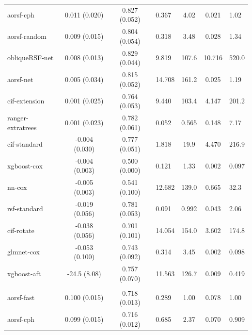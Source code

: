 \documentclass[twoside,11pt]{article}\usepackage[]{graphicx}\usepackage[]{xcolor}
\newenvironment{knitrout}{}{} %
\begin{document}
\begin{knitrout}
\begin{longtable}{lcclccl}
\hspace{1em}aorsf-cph & 0.011 (0.020) & 0.827 (0.052) & 0.367 & 4.02 & 0.021 & 1.02\\
\hspace{1em}aorsf-random & 0.009 (0.015) & 0.804 (0.054) & 0.318 & 3.48 & 0.028 & 1.34\\
\hspace{1em}obliqueRSF-net & 0.008 (0.013) & 0.829 (0.044) & 9.819 & 107.6 & 10.716 & 520.0\\
\hspace{1em}aorsf-net & 0.005 (0.034) & 0.815 (0.052) & 14.708 & 161.2 & 0.025 & 1.19\\
\hspace{1em}cif-extension & 0.001 (0.025) & 0.764 (0.053) & 9.440 & 103.4 & 4.147 & 201.2\\
\hspace{1em}ranger-extratrees & 0.001 (0.023) & 0.782 (0.061) & 0.052 & 0.565 & 0.148 & 7.17\\
\hspace{1em}cif-standard & -0.004 (0.030) & 0.777 (0.051) & 1.818 & 19.9 & 4.470 & 216.9\\
\hspace{1em}xgboost-cox & -0.004 (0.003) & 0.500 (0.000) & 0.121 & 1.33 & 0.002 & 0.097\\
\hspace{1em}nn-cox & -0.005 (0.003) & 0.541 (0.100) & 12.682 & 139.0 & 0.665 & 32.3\\
\hspace{1em}rsf-standard & -0.019 (0.056) & 0.781 (0.053) & 0.091 & 0.992 & 0.043 & 2.06\\
\hspace{1em}cif-rotate & -0.038 (0.056) & 0.701 (0.101) & 14.054 & 154.0 & 3.602 & 174.8\\
\hspace{1em}glmnet-cox & -0.053 (0.100) & 0.743 (0.092) & 0.314 & 3.45 & 0.002 & 0.098\\
\hspace{1em}xgboost-aft & -24.5 (8.08) & 0.757 (0.070) & 11.563 & 126.7 & 0.009 & 0.419\\
\addlinespace[0.3em]
\hline
\multicolumn{7}{l}{\textit{\textbf{Colon cancer; death, n = 929, p = 12}}}\\
\hline
\hspace{1em}aorsf-fast & 0.100 (0.015) & 0.718 (0.013) & 0.289 & 1.00 & 0.078 & 1.00\\
\hspace{1em}aorsf-cph & 0.099 (0.015) & 0.716 (0.012) & 0.685 & 2.37 & 0.070 & 0.909\\

\end{longtable}
\end{knitrout}
\end{document}
